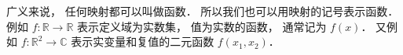 

广义来说， 任何映射都可以叫做函数． 所以我们也可以用映射的记号表示函数． 例如 $f: \mathbb R \to \mathbb R$ 表示定义域为实数集， 值为实数的函数， 通常记为 $f(x)$． 又例如 $f: \mathbb R^2 \to \mathbb C$ 表示实变量和复值的二元函数 $f(x_1, x_2)$．
